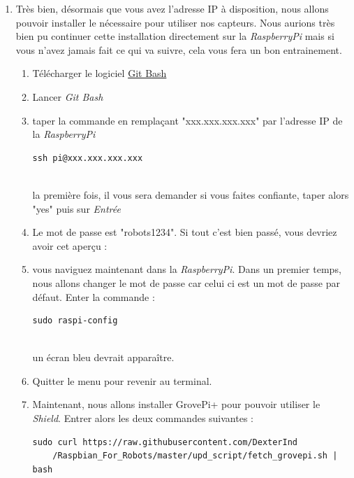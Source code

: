 \begin{enumerate}
	\item Très bien, désormais que vous avez l'adresse IP à disposition, nous allons pouvoir installer le nécessaire pour utiliser nos capteurs. Nous aurions très bien pu continuer cette installation directement sur la \textit{RaspberryPi} mais si vous n'avez jamais fait ce qui va suivre, cela vous fera un bon entrainement.\\

\begin{enumerate} 
	\item Télécharger le logiciel \href{https://git-for-windows.github.io/}{Git Bash}
	\item Lancer \textit{Git Bash}
	\item taper la commande en remplaçant "xxx.xxx.xxx.xxx" par l'adresse IP de la \textit{RaspberryPi}\\
	\begin{lstlisting}[style=MyBashStyle]
	ssh pi@xxx.xxx.xxx.xxx
	\end{lstlisting}\\
la première fois, il vous sera demander si vous faites confiante, taper alors "yes" puis sur \textit{Entrée}
	\item Le mot de passe est "robots1234". Si tout c'est bien passé, vous devriez avoir cet aperçu :
	
	\item vous naviguez maintenant dans la \textit{RaspberryPi}. Dans un premier temps, nous allons changer le mot de passe car celui ci est un mot de passe par défaut. Enter la commande :\\
	\begin{lstlisting}[style=MyBashStyle]
	sudo raspi-config
	\end{lstlisting}\\
	un écran bleu devrait apparaître. %
	
	\item Quitter le menu pour revenir au terminal.
	\item Maintenant, nous allons installer GrovePi+ pour pouvoir utiliser le \textit{Shield}. Entrer alors les deux commandes suivantes :\\
	\begin{lstlisting}[style=MyBashStyle]
	sudo curl https://raw.githubusercontent.com/DexterInd
	/Raspbian_For_Robots/master/upd_script/fetch_grovepi.sh | bash
	 

\end{lstlisting}
\end{enumerate}
\end{enumerate}
